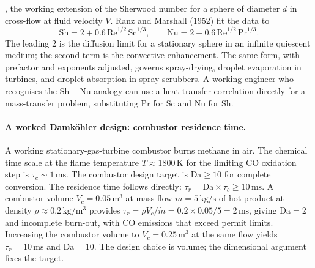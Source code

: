 , the working extension of the
Sherwood number for a sphere of diameter $d$ in cross-flow at
fluid velocity $V$. Ranz and Marshall (1952)
\cite{paper:ch02t3b-ranz-marshall-1952} fit the data to
\[
\mathrm{Sh} = 2 + 0.6 \,\mathrm{Re}^{1/2}\,\mathrm{Sc}^{1/3},
\qquad \mathrm{Nu} = 2 + 0.6 \,\mathrm{Re}^{1/2}\,\mathrm{Pr}^{1/3}.
\]
The leading $2$ is the diffusion limit for a stationary sphere
in an infinite quiescent medium; the second term is the convective
enhancement. The same form, with prefactor and exponents adjusted,
governs spray-drying, droplet evaporation in turbines, and droplet
absorption in spray scrubbers. A working engineer who recognises
the $\mathrm{Sh} - \mathrm{Nu}$ analogy can use a heat-transfer
correlation directly for a mass-transfer problem, substituting
$\mathrm{Pr}$ for $\mathrm{Sc}$ and $\mathrm{Nu}$ for $\mathrm{Sh}$.

\paragraph{A worked Damk\"ohler design: combustor residence time.}
A working stationary-gas-turbine combustor burns methane in air.
The chemical time scale at the flame temperature
$T \approx 1800 \,\si{\kelvin}$ for the limiting CO oxidation step
is $\tau_{c} \sim 1 \,\si{\milli\second}$. The combustor design
target is $\mathrm{Da} \geq 10$ for complete conversion. The
residence time follows directly: $\tau_{r} = \mathrm{Da} \times
\tau_{c} \geq 10 \,\si{\milli\second}$. A combustor volume
$V_{c} = 0.05 \,\si{\meter\cubed}$ at mass flow
$\dot{m} = 5 \,\si{\kilogram\per\second}$ of hot product at
density $\rho \approx 0.2 \,\si{\kilogram\per\meter\cubed}$
provides $\tau_{r} = \rho V_{c} / \dot{m}
= 0.2 \times 0.05 / 5 = 2 \,\si{\milli\second}$,
giving $\mathrm{Da} = 2$ and incomplete burn-out, with CO
emissions that exceed permit limits. Increasing the combustor
volume to $V_{c} = 0.25 \,\si{\meter\cubed}$ at the same flow
yields $\tau_{r} = 10 \,\si{\milli\second}$ and $\mathrm{Da} = 10$.
The design choice is volume; the dimensional argument fixes the
target.

